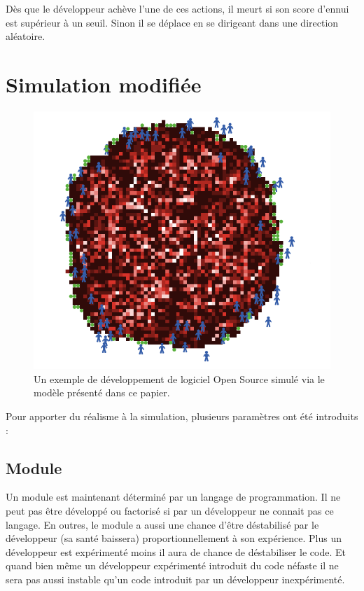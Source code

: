\documentclass{article}
\begin{document}
Dès que le développeur achève l'une de ces actions, il meurt si son score d'ennui est supérieur à un seuil. Sinon il se déplace en se dirigeant dans une direction aléatoire.

\section{Simulation modifiée}

\begin{figure}[H]
 \centerline{\includegraphics[scale=0.45]{pictures/Image1.png}}
\caption{Un exemple de développement de logiciel Open Source
  simulé via le modèle présenté dans ce papier.}
 \end{figure}

Pour apporter du réalisme à la simulation, plusieurs paramètres ont été introduits :

\subsection{Module}
Un module est maintenant déterminé par un langage de programmation. Il ne peut pas être développé ou factorisé si par un développeur ne connait pas ce langage. En outres, le module a aussi une chance d'être déstabilisé par le développeur (sa santé baissera) proportionnellement à son expérience. Plus un développeur est expérimenté moins il aura de chance de déstabiliser le code. Et quand bien même un développeur expérimenté introduit du code néfaste il ne sera pas aussi instable qu'un code introduit par un développeur inexpérimenté.
\end{document}
